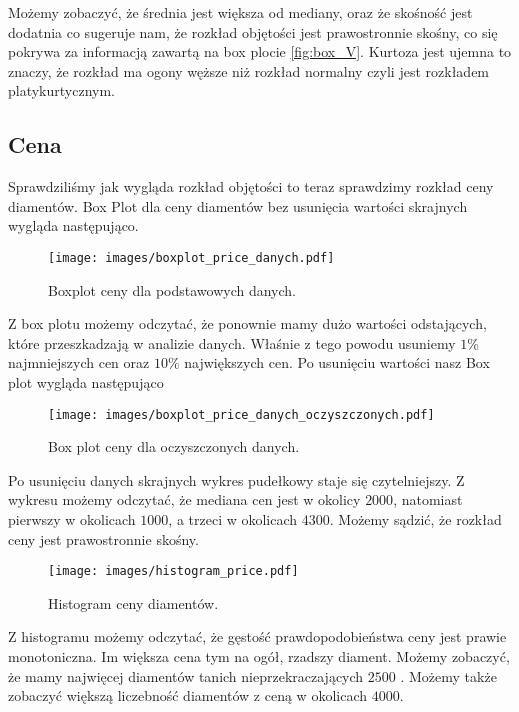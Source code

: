\documentclass[12pt]{article}
\theoremstyle{exer}
\begin{document}
	\begin{table}[H]
		\caption{Podstawowe statystyki opisowe dla objętości.}
		\label{tab:statystyki_V}
	\end{table}
	Możemy zobaczyć, że średnia jest większa  od mediany, oraz że skośność jest dodatnia co sugeruje nam, że rozkład objętości jest prawostronnie skośny, co się pokrywa za informacją zawartą na box plocie \ref{fig:box_V}. Kurtoza jest ujemna to znaczy, że rozkład ma ogony węższe niż rozkład normalny czyli jest rozkładem platykurtycznym. 
	
	\subsection{Cena}
	Sprawdziliśmy jak wygląda rozkład objętości to teraz sprawdzimy rozkład ceny diamentów.
	Box Plot dla ceny diamentów bez usunięcia wartości skrajnych wygląda następująco.
	\begin{figure}[H]
		\centering
		\texttt{[image: images/boxplot\_price\_danych.pdf]}
		\caption{Boxplot ceny dla podstawowych danych.}
		\label{fig:box_price_orginal}
	\end{figure}
	
	Z box plotu możemy odczytać, że ponownie mamy dużo wartości odstających, które przeszkadzają w analizie danych. Właśnie z tego powodu usuniemy $ 1 \% $ najmniejszych cen oraz  $ 10\%$ największych cen.
	Po usunięciu wartości nasz Box plot wygląda następująco
	\begin{figure}[H]
		\centering
		\texttt{[image: images/boxplot\_price\_danych\_oczyszczonych.pdf]}
		\caption{Box plot ceny dla oczyszczonych danych.}
		\label{fig:box_price}
	\end{figure}
	Po usunięciu danych skrajnych wykres pudełkowy staje się czytelniejszy. Z wykresu możemy odczytać, że mediana cen jest w okolicy $2000$, natomiast pierwszy w okolicach $1000$, a trzeci w okolicach $4300$. Możemy sądzić, że rozkład ceny jest prawostronnie skośny.
	
	\begin{figure}[H]
		\centering
		\texttt{[image: images/histogram\_price.pdf]}
		\caption{Histogram ceny diamentów.}
		\label{fig:hist_price}
	\end{figure}
 Z histogramu możemy odczytać, że gęstość prawdopodobieństwa ceny jest prawie monotoniczna. Im większa cena tym na ogół, rzadszy diament. Możemy zobaczyć, że mamy najwięcej diamentów tanich nieprzekraczających $2500$ . Możemy także zobaczyć większą liczebność diamentów z ceną w okolicach $4000$. 
 
\end{document}
